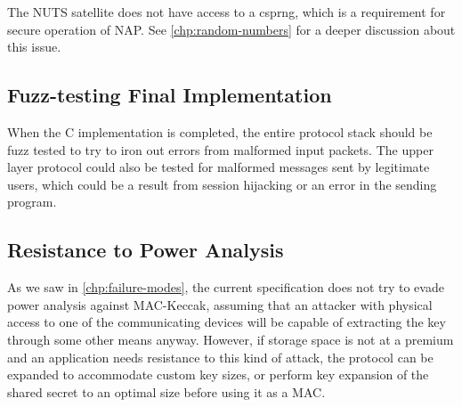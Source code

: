 The NUTS satellite does not have access to a \acrfull{csprng}, which is a requirement for secure operation of NAP. See \autoref{chp:random-numbers} for a deeper discussion about this issue.


    \subsection{Fuzz-testing Final Implementation}

When the C implementation is completed, the entire protocol stack should be fuzz tested to try to iron out errors from malformed input packets. The upper layer protocol could also be tested for malformed messages sent by legitimate users, which could be a result from session hijacking or an error in the sending program.


    \subsection{Resistance to Power Analysis}

As we saw in \autoref{chp:failure-modes}, the current specification does not try to evade power analysis against MAC-Keccak, assuming that an attacker with physical access to one of the communicating devices will be capable of extracting the key through some other means anyway. However, if storage space is not at a premium and an application needs resistance to this kind of attack, the protocol can be expanded to accommodate custom key sizes, or perform key expansion of the shared secret to an optimal size before using it as a MAC.

